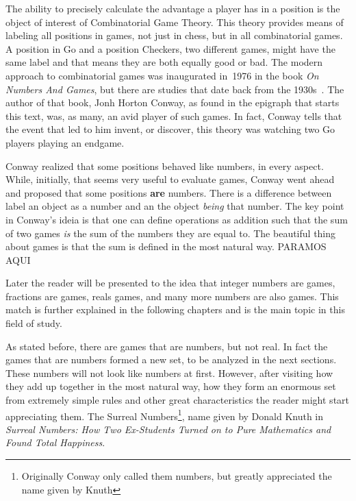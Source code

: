 The ability to precisely calculate the advantage a player has in a
position is the object of interest of Combinatorial Game Theory.
This theory provides means of labeling all positions in games, not
just in chess, but in all combinatorial games.
A position in Go and a position Checkers, two different games,
might have the same label and that means they are both equally
good or bad. The modern approach to combinatorial games
was inaugurated in~1976 in the book
\textit{On Numbers And Games}, but there are studies that date
back from the 1930s~\cite{CGT}.
The author of that book, Jonh Horton Conway, as
found in the epigraph that starts this text, was, as many, an avid
player of such games.
In fact, Conway tells that the event that led to
him invent, or discover, this theory was watching two Go players
playing an endgame.

Conway realized that some positions
behaved like numbers, in every aspect.
While, initially, that seems very useful to evaluate games,
Conway went ahead and proposed that some positions \textbf{are}
numbers.
There is a  difference between label an object
as a number and an the object \textit{being} that number.
The key point in Conway's ideia is
that one can define operations as addition
such that the sum of two games
\textit{is} the sum of the numbers they are equal to.
The beautiful thing about games is that the sum is defined
in the most natural way.
PARAMOS AQUI

Later the reader will be presented to the  idea that
integer numbers are games, fractions are games, reals games,
and many more numbers are also games.
This match is further explained in the
following chapters and is the main topic in this
field of study.

As stated before, there are games that are numbers, but not real. In fact the games that are numbers formed a new set, to be analyzed in the next sections. These numbers will not look like numbers at first. However, after visiting how they add up together in the most natural way, how they form an enormous set from extremely simple rules and other great characteristics the reader might start appreciating them. The Surreal Numbers\footnote{Originally Conway only called them numbers, but greatly appreciated the name given by Knuth}, name given by Donald Knuth in \textit{Surreal Numbers: How Two Ex-Students Turned on to Pure Mathematics and Found Total Happiness}.

